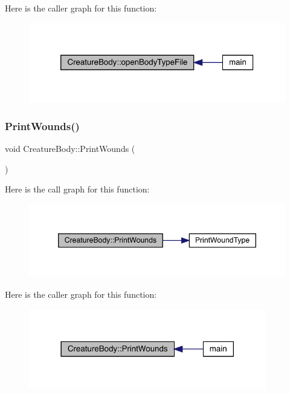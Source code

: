 Here is the caller graph for this function\+:
\nopagebreak
\begin{figure}[H]
\begin{center}
\leavevmode
\includegraphics[width=320pt]{class_creature_body_ac4140e081c8970ad4330c253c615ba33_icgraph}
\end{center}
\end{figure}
\mbox{\label{class_creature_body_a82e519351551538b1138fea170776f3f}} 
\subsubsection{\texorpdfstring{Print\+Wounds()}{PrintWounds()}}
{\footnotesize\ttfamily void Creature\+Body\+::\+Print\+Wounds (\begin{DoxyParamCaption}{ }\end{DoxyParamCaption})}

Here is the call graph for this function\+:
\nopagebreak
\begin{figure}[H]
\begin{center}
\leavevmode
\includegraphics[width=346pt]{class_creature_body_a82e519351551538b1138fea170776f3f_cgraph}
\end{center}
\end{figure}
Here is the caller graph for this function\+:
\nopagebreak
\begin{figure}[H]
\begin{center}
\leavevmode
\includegraphics[width=294pt]{class_creature_body_a82e519351551538b1138fea170776f3f_icgraph}
\end{center}
\end{figure}
\mbox{\label{class_creature_body_a52d765dd974e81a549fd0cb27b355cf2}} 
